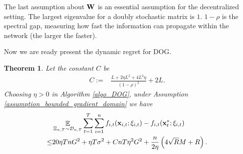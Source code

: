 \documentclass{article}
\newtheorem{Theorem}{\bf{Theorem}}
\begin{document}
The last assumption about ${\bf W}$ is an essential assumption for the decentralized setting. The largest eigenvalue for a doubly stochastic matrix is $1$. $1-\rho$ is the spectral gap, measuring how fast the information can propagate within the network (the larger the faster). 

Now we are ready present the dynamic regret for DOG.
\begin{Theorem}
\label{theorem_regret_upper_bound}
Let the constant $C$ be
\begin{align}
\nonumber
C := & \frac{L + 2\eta L^2  + 4L^2 \eta}{(1-\rho)^2} +2L.
\end{align} Choosing $\eta>0$ in Algorithm \ref{algo_DOG}, under Assumption \ref{assumption_bounded_gradient_domain} we have
\begin{align}
\nonumber
& \mathop{\mathbb{E}}_{ \Xi_{n,T} \sim \mathcal{D}_{n,T} } \sum_{t=1}^T\sum_{i=1}^n f_{i,t}({\bf x}_{i,t};\xi_{i,t}) - f_{i,t}({\bf x}_t^\ast;\xi_{i,t}) \\ \nonumber
\le & 20\eta T n G^2 +  \eta T\sigma^2 + C nT\eta^2 G^2    + \frac{n}{2\eta}\left(  4\sqrt{R}M + R   \right).
\end{align}
\end{Theorem}
\end{document}
